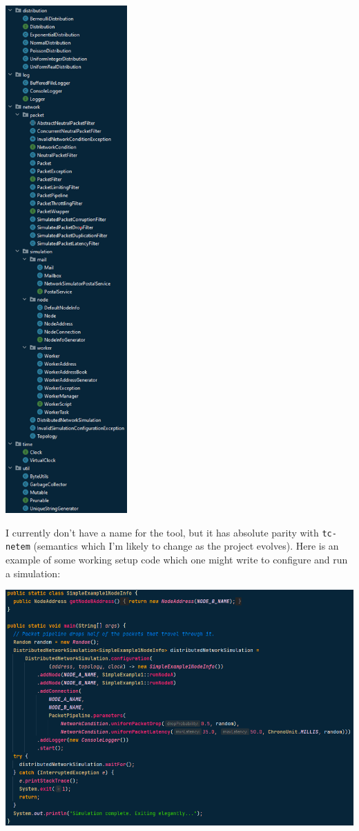 \begin{center}
    \includegraphics[width=0.35\textwidth]{images/interim_file_structure}
\end{center}

I currently don't have a name for the tool, but it has absolute parity with \texttt{tc-netem} (semantics which I'm
likely to change as the project evolves). Here is an example of some working setup code which one might write to
configure and run a simulation:

\begin{center}
    \includegraphics[width=\textwidth]{images/interim_example_sim_code}
\end{center}

